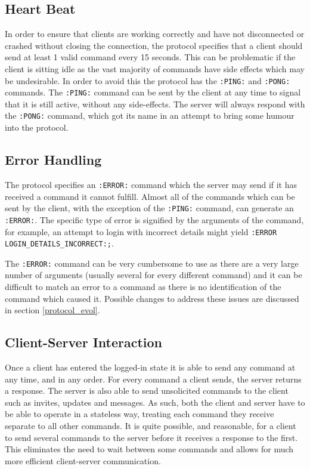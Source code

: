 \subsection{Heart Beat}

In order to ensure that clients are working correctly and have not disconnected or crashed without closing the connection, the protocol specifies that a client should send at least 1 valid command every 15 seconds. This can be problematic if the client is sitting idle as the vast majority of commands have side effects which may be undesirable. In order to avoid this the protocol has the \texttt{:PING:} and \texttt{:PONG:} commands. The \texttt{:PING:} command can be sent by the client at any time to signal that it is still active, without any side-effects. The server will always respond with the \texttt{:PONG:} command, which got its name in an attempt to bring some humour into the protocol. %

\subsection{Error Handling}

The protocol specifies an \texttt{:ERROR:} command which the server may send if it has received a command it cannot fulfill. Almost all of the commands which can be sent by the client, with the exception of the \texttt{:PING:} command, can generate an \texttt{:ERROR:}. The specific type of error is signified by the arguments of the command, for example, an attempt to login with incorrect details might yield \texttt{:ERROR LOGIN\_DETAILS\_INCORRECT:;}. %

The \texttt{:ERROR:} command can be very cumbersome to use as there are a very large number of arguments (usually several for every different command) and it can be difficult to match an error to a command as there is no identification of the command which caused it. Possible changes to address these issues are discussed in section \ref{protocol_evol}.

\subsection{Client-Server Interaction}

Once a client has entered the logged-in state it is able to send any command at any time, and in any order. For every command a client sends, the server returns a response. The server is also able to send unsolicited commands to the client such as invites, updates and messages. As such, both the client and server have to be able to operate in a stateless way, treating each command they receive separate to all other commands. It is quite possible, and reasonable, for a client to send several commands to the server before it receives a response to the first. This eliminates the need to wait between some commands and allows for much more efficient client-server communication.

